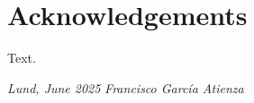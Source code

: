 
\chapter*{Acknowledgements}

		


Text.

\addvspace{1.3cm}

\textit{Lund, June 2025} \hfill \textit{Francisco García Atienza}









